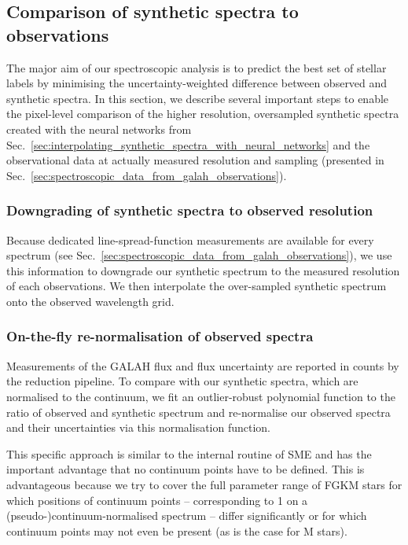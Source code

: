 \documentclass[
  journal=pasa,
  manuscript=research-paper, %
  year=2023,
  volume=37
]{cup-journal}
\begin{document}
\subsection{Comparison of synthetic spectra to observations}
\label{sec:comparison_synthetic_spectra_to_observations}

The major aim of our spectroscopic analysis is to predict the best set of stellar labels by minimising the uncertainty-weighted difference between observed and synthetic spectra. In this section, we describe several important steps to enable the pixel-level comparison of the higher resolution, oversampled synthetic spectra created with the neural networks from Sec.~\ref{sec:interpolating_synthetic_spectra_with_neural_networks} and the observational data at actually measured resolution and sampling (presented in Sec.~\ref{sec:spectroscopic_data_from_galah_observations}).

\subsubsection{Downgrading of synthetic spectra to observed resolution}

Because dedicated line-spread-function measurements are available for every spectrum (see Sec.~\ref{sec:spectroscopic_data_from_galah_observations}), we use this information to downgrade our synthetic spectrum to the measured resolution of each observations. We then interpolate the over-sampled synthetic spectrum onto the observed wavelength grid.

\subsubsection{On-the-fly re-normalisation of observed spectra}

Measurements of the GALAH flux and flux uncertainty are reported in counts by the reduction pipeline. To compare with our synthetic spectra, which are normalised to the continuum, we fit an outlier-robust polynomial function to the ratio of observed and synthetic spectrum and re-normalise our observed spectra and their uncertainties via this normalisation function.

This specific approach is similar to the internal routine of \textsc{SME} \citep{Piskunov2017} and has the important advantage that no continuum points have to be defined. This is advantageous because we try to cover the full parameter range of FGKM stars for which positions of continuum points -- corresponding to 1 on a (pseudo-)continuum-normalised spectrum -- differ significantly or for which continuum points may not even be present (as is the case for M stars).
\end{document}

